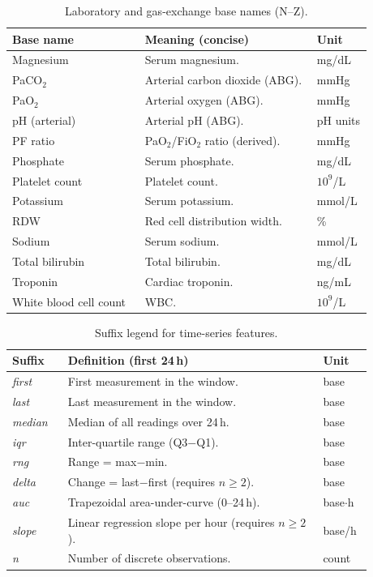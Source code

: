 \vspace{0.5\baselineskip}
\begin{table}[t]\centering
{\small\renewcommand{\arraystretch}{1.12}\setlength{\tabcolsep}{6pt}%
\caption{Laboratory and gas-exchange base names (N--Z).}
\label{app:tab-labs-n-z}
\begin{tabular}{P{0.34\linewidth} P{0.44\linewidth} P{0.10\linewidth}}
\toprule
\textbf{Base name} & \textbf{Meaning (concise)} & \textbf{Unit}\\
\midrule
Magnesium & Serum magnesium. & mg/dL\\
PaCO$_2$ & Arterial carbon dioxide (ABG). & mmHg\\
PaO$_2$ & Arterial oxygen (ABG). & mmHg\\
pH (arterial) & Arterial pH (ABG). & pH units\\
PF ratio & PaO$_2$/FiO$_2$ ratio (derived). & mmHg\\
Phosphate & Serum phosphate. & mg/dL\\
Platelet count & Platelet count. & $10^{9}$/L\\
Potassium & Serum potassium. & mmol/L\\
RDW & Red cell distribution width. & \%\\
Sodium & Serum sodium. & mmol/L\\
Total bilirubin & Total bilirubin. & mg/dL\\
Troponin & Cardiac troponin. & ng/mL\\
White blood cell count & WBC. & $10^{9}$/L\\
\bottomrule
\end{tabular}}
\end{table}

\vspace{0.75\baselineskip}
\begin{table}[t]\centering
{\small\renewcommand{\arraystretch}{1.12}\setlength{\tabcolsep}{6pt}%
\caption{Suffix legend for time-series features.}
\label{app:tab-suffixes}
\begin{tabular}{P{0.14\linewidth} P{0.64\linewidth} P{0.10\linewidth}}
\toprule
\textbf{Suffix} & \textbf{Definition (first 24\,h)} & \textbf{Unit}\\
\midrule
\textit{first}  & First measurement in the window. & base\\
\textit{last}   & Last measurement in the window. & base\\
\textit{median} & Median of all readings over 24\,h. & base\\
\textit{iqr}    & Inter-quartile range (Q3$-$Q1). & base\\
\textit{rng}    & Range = max$-$min. & base\\
\textit{delta}  & Change = last$-$first (requires $n\ge2$). & base\\
\textit{auc}    & Trapezoidal area-under-curve (0--24\,h). & base$\cdot$h\\
\textit{slope}  & Linear regression slope per hour (requires $n\ge2$). & base/h\\
\textit{n}      & Number of discrete observations. & count\\
\bottomrule
\end{tabular}}
\end{table}